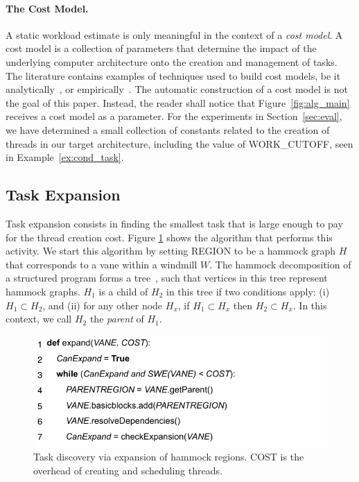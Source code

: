 \documentclass[sigplan,10pt,review,anonymous]{acmart}
\begin{document}
\paragraph{The Cost Model.}
A static workload estimate is only meaningful in the context of a {\em cost
model}.
A cost model is a collection of parameters that determine the impact of the
underlying computer architecture onto the creation and management of tasks.
The literature contains examples of techniques used to build cost models,
be it analytically~\cite{Baghsorkhi10}, or empirically~\cite{Poesia17}.
The automatic construction of a cost model is not the goal of this paper.
Instead, the reader shall notice that Figure~\ref{fig:alg_main} receives a
cost model as a parameter.
For the experiments in Section~\ref{sec:eval}, we have determined a small
collection of constants related to the creation of threads in our target
architecture, including the value of \textsf{WORK\_CUTOFF}, seen in
Example~\ref{ex:cond_task}.

\subsection{Task Expansion}
\label{sub:expansion}

Task expansion consists in finding the smallest task that is large enough to
pay for the thread creation cost.
Figure \ref{fig:expand_alg} shows the algorithm that performs this activity.
We start this algorithm by setting \textsf{REGION} to be a hammock graph $H$
that corresponds to a vane within a windmill $W$.
The hammock decomposition of a structured program forms a tree~\cite{Ferrante87},
such that vertices in this tree represent hammock graphs.
$H_1$ is a child of $H_2$ in this tree if two conditions apply:
(i) $H_1 \subset H_2$, and (ii) for any 
other node $H_x$, if $H_1 \subset H_x$ then $H_2 \subset H_x$.
In this context, we call $H_2$ the {\em parent} of $H_1$.

\begin{figure}[h]
\begin{center}
\includegraphics[width=1\columnwidth]{images/expand_alg}
\caption{Task discovery via expansion of hammock regions.
\textsf{COST} is the overhead of creating and scheduling threads.}
\label{fig:expand_alg}
\end{center}
\end{figure}
\end{document}
